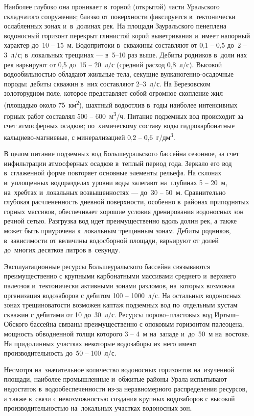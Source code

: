 Наиболее глубоко она проникает в~горной (открытой) части Уральского складчатого сооружения; близко от поверхности фиксируется в~тектонически ослабленных зонах и~в~долинах рек. На площади Зауральского пенеплена водоносный горизонт перекрыт глинистой корой выветривания и~имеет напорный характер до~10 -- 15~м. Водопритоки в~скважины составляют от 0,1  -- 0,5 до~2  -- 3~л/с; в~локальных трещинах  --- в~5–10 раз выше. Дебиты родников в~доли нах рек варьируют от 0,5 до~15  -- 20~л/с (средний расход 0,8~л/с).
Высокой водообильностью обладают жильные тела, секущие вулканогенно-осадочные породы: дебиты скважин в~них составляют 2–3~л/с. На Березовском золоторудном поле, которое представляет собой огромное скопление жил (площадью около 75~км\textsuperscript{2}), шахтный водоотлив в~годы наиболее интенсивных горных работ составлял 500  -- 600~м\textsuperscript{3}/ч. Питание подземных вод происходит за счет атмосферных осадков; по~химическому составу воды гидрокарбонатные кальциево-магниевые, с минерализацией 0,2  -- 0,6~г/дм\textsuperscript{3}.

В целом питание подземных вод Большеуральского бассейна сезонное, за счет инфильтрации атмосферных осадков в~теплый период года. Зеркало его вод в~сглаженной форме повторяет основные элементы рельефа. На склонах и~уплощенных водоразделах уровни воды залегают на~глубинах 5  -- 20~м, на~хребтах и~локальных возвышенностях  --- до~30  -- 50~м. Сравнительно глубокая расчлененность дневной поверхности, особенно в~районах приподнятых горных массивов, обеспечивает хорошие условия дренирования водоносных зон речной сетью. Разгрузка вод идет преимущественно вдоль долин рек, а также может быть приурочена к~локальным трещинным зонам. Дебиты родников, в~зависимости от величины водосборной площади, варьируют от долей до~многих десятков литров в~секунду.

Эксплуатационные ресурсы Большеуральского бассейна связываются преимущественно с крупными карбонатными массивами среднего и~верхнего палеозоя и~тектонически активными зонами разломов, на~которых возможна организация водозаборов с дебитом 100 -- 1000~л/с. На остальных водоносных зонах трещиноватости возможен каптаж подземных вод по~отдельным кустам скважин с дебитами от 10 до~30~л/с. Ресурсы порово--пластовых вод Иртыш--Обского бассейна связаны преимущественно с опоковым горизонтом палеоцена, мощность обводненной толщи которого 3 -- 4~м на~западе и~до~50~м на~востоке. На придолинных участках некоторые водозаборы из~него имеют производительность до~50 -- 100~л/с.

Несмотря на~значительное количество водоносных горизонтов на~изученной площади, наиболее промышленные и~обжитые районы Урала испытывают недостаток в~водообеспеченности из-за неравномерного распределения ресурсов, а также в~связи с невозможностью создания крупных водозаборов с высокой производительностью на~локальных участках водоносных зон.
